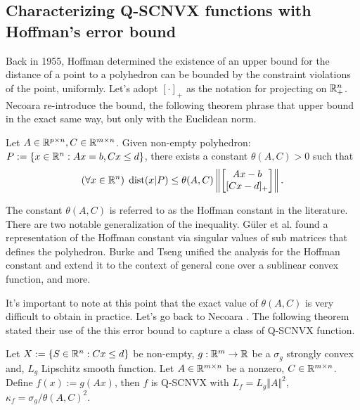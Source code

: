 \documentclass[12pt]{report}
\begin{document}
        \subsection{Characterizing Q-SCNVX functions with Hoffman's error bound}
            Back in 1955, Hoffman \cite{hoffman_approximate_1952} determined the existence of an upper bound for the distance of a point to a polyhedron can be bounded by the constraint violations of the point, uniformly. 
            Let's adopt $[\cdot]_+$ as the notation for projecting on $\mathbb R^n_+$. 
            Necoara re-introduce the bound, the following theorem phrase that upper bound in the exact same way, but only with the Euclidean norm. 
            \begin{theorem}
                Let $A \in \mathbb R^{p \times n}, C \in \mathbb R^{m\times n}$. 
                Given non-empty polyhedron: $P := \{x \in \mathbb R^n : Ax = b, Cx \le d\}$, there exists a constant $\theta(A, C) > 0$ such that 
                \begin{align*}
                    (\forall x \in \mathbb R^n)\; \operatorname{dist}(x | P) \le \theta(A, C)\left\Vert
                        \begin{bmatrix}
                            Ax - b \\ [Cx - d]_+
                        \end{bmatrix}
                    \right\Vert. 
                \end{align*}
            \end{theorem}
            The constant $\theta(A, C)$ is referred to as the Hoffman constant in the literature. 
            There are two notable generalization of the inequality. 
            Güler et al. \cite{guler_approximations_1995} found a representation of the Hoffman constant via singular values of sub matrices that defines the polyhedron. 
            Burke and Tseng \cite{burke_unified_1996} unified the analysis for the Hoffman constant and extend it to the context of general cone over a sublinear convex function, and more. 
            \par 
            It's important to note at this point that the exact value of $\theta(A, C)$ is very difficult to obtain in practice. 
            Let's go back to Necoara \cite{necoara_linear_2019}. 
            The following theorem stated their use of the this error bound to capture a class of Q-SCNVX function. 
            \begin{theorem}\label{thm:q-scnvx-hffmn-eb}
                Let $X := \{S \in \mathbb R^n: Cx \le d\}$ be non-empty, $g:\mathbb R^m \rightarrow \mathbb R$ be a $\sigma_g$ strongly convex and, $L_g$ Lipschitz smooth function. 
                Let $A \in \mathbb R^{m\times n}$ be a nonzero, $C \in \mathbb R^{m\times n}$. 
                Define $f(x):= g(Ax)$, then $f$ is Q-SCNVX with $L_f = L_g\Vert A\Vert^2$, $\kappa_f = \sigma_g/\theta(A, C)^2$. 
            \end{theorem}
\end{document}
